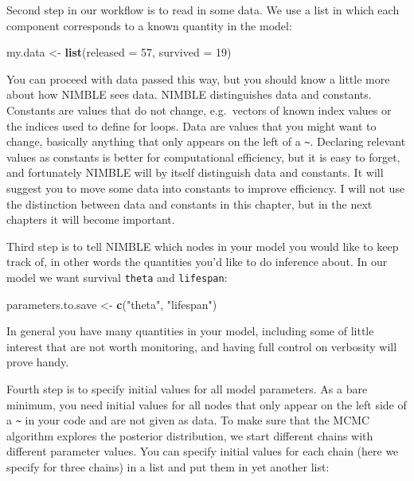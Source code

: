 \documentclass[
  12pt,
]{krantz}
\newenvironment{Shaded}{\begin{snugshade}}{\end{snugshade}}
\newcommand{\AttributeTok}[1]{\textcolor[rgb]{0.13,0.29,0.53}{#1}}
\newcommand{\DecValTok}[1]{\textcolor[rgb]{0.00,0.00,0.81}{#1}}
\newcommand{\FunctionTok}[1]{\textcolor[rgb]{0.13,0.29,0.53}{\textbf{#1}}}
\newcommand{\NormalTok}[1]{#1}
\newcommand{\OtherTok}[1]{\textcolor[rgb]{0.56,0.35,0.01}{#1}}
\newcommand{\StringTok}[1]{\textcolor[rgb]{0.31,0.60,0.02}{#1}}
\begin{document}
Second step in our workflow is to read in some data. We use a list in which each component corresponds to a known quantity in the model:

\begin{Shaded}
\begin{Highlighting}[]
\NormalTok{my.data }\OtherTok{\textless{}{-}} \FunctionTok{list}\NormalTok{(}\AttributeTok{released =} \DecValTok{57}\NormalTok{, }\AttributeTok{survived =} \DecValTok{19}\NormalTok{)}
\end{Highlighting}
\end{Shaded}

You can proceed with data passed this way, but you should know a little more about how NIMBLE sees data. NIMBLE distinguishes data and constants. Constants are values that do not change, e.g.~vectors of known index values or the indices used to define for loops. Data are values that you might want to change, basically anything that only appears on the left of a \texttt{\textasciitilde{}}. Declaring relevant values as constants is better for computational efficiency, but it is easy to forget, and fortunately NIMBLE will by itself distinguish data and constants. It will suggest you to move some data into constants to improve efficiency. I will not use the distinction between data and constants in this chapter, but in the next chapters it will become important.

Third step is to tell NIMBLE which nodes in your model you would like to keep track of, in other words the quantities you'd like to do inference about. In our model we want survival \texttt{theta} and \texttt{lifespan}:

\begin{Shaded}
\begin{Highlighting}[]
\NormalTok{parameters.to.save }\OtherTok{\textless{}{-}} \FunctionTok{c}\NormalTok{(}\StringTok{"theta"}\NormalTok{, }\StringTok{"lifespan"}\NormalTok{)}
\end{Highlighting}
\end{Shaded}

In general you have many quantities in your model, including some of little interest that are not worth monitoring, and having full control on verbosity will prove handy.

Fourth step is to specify initial values for all model parameters. As a bare minimum, you need initial values for all nodes that only appear on the left side of a \texttt{\textasciitilde{}} in your code and are not given as data. To make sure that the MCMC algorithm explores the posterior distribution, we start different chains with different parameter values. You can specify initial values for each chain (here we specify for three chains) in a list and put them in yet another list:
\end{document}
